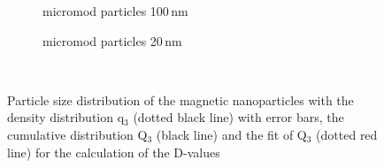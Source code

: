 \begin{figure}[H]
          \begin{subfigure}{0.49\textwidth}
                  \caption{micromod particles 100\,nm}\label{fig:hist_micro_100}
          \end{subfigure}\hfill
        \begin{subfigure}{0.49\textwidth}
                \caption{micromod particles 20\,nm}\label{fig:hist_micro_20}
        \end{subfigure}
        \\        
        \caption[Volumetric particle size distribution of the magnetic nanoparticles]{Particle size distribution of the magnetic nanoparticles with the density distribution q$_{3}$ (dotted black line) with error bars, the cumulative distribution Q$_{3}$ (black line) and the fit of Q$_{3}$ (dotted red line) for the calculation of the D-values}
        \label{fig:Hist_nano}
  \end{figure} 
  
